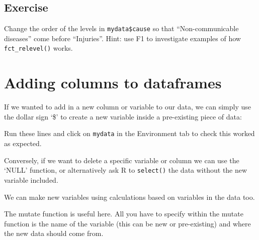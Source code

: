 \documentclass[12pt,]{krantz}
\makeatletter
\newenvironment{Shaded}{\begin{snugshade}}{\end{snugshade}}
\newcommand{\DecValTok}[1]{\textcolor[rgb]{0.00,0.00,0.81}{#1}}
\newcommand{\KeywordTok}[1]{\textcolor[rgb]{0.13,0.29,0.53}{\textbf{#1}}}
\newcommand{\NormalTok}[1]{#1}
\newcommand{\OperatorTok}[1]{\textcolor[rgb]{0.81,0.36,0.00}{\textbf{#1}}}
\newcommand{\OtherTok}[1]{\textcolor[rgb]{0.56,0.35,0.01}{#1}}
\newcommand{\StringTok}[1]{\textcolor[rgb]{0.31,0.60,0.02}{#1}}
\newenvironment{kframe}{%
\medskip{}
\setlength{\fboxsep}{.8em}
 \def\at@end@of@kframe{}%
 \ifinner\ifhmode%
  \def\at@end@of@kframe{\end{minipage}}%
  \begin{minipage}{\columnwidth}%
 \fi\fi%
 \def\FrameCommand##1{\hskip\@totalleftmargin \hskip-\fboxsep
 \colorbox{shadecolor}{##1}\hskip-\fboxsep
     \hskip-\linewidth \hskip-\@totalleftmargin \hskip\columnwidth}%
 \MakeFramed {\advance\hsize-\width
   \@totalleftmargin\z@ \linewidth\hsize
   \@setminipage}}%
 {\par\unskip\endMakeFramed%
 \at@end@of@kframe}
\renewenvironment{Shaded}{\begin{kframe}}{\end{kframe}}
\theoremstyle{definition}
\theoremstyle{definition}
\theoremstyle{definition}
\theoremstyle{remark}
\makeatother
\begin{document}
\hypertarget{exercise-4}{%
\subsection{Exercise}\label{exercise-4}}

Change the order of the levels in \texttt{mydata\$cause} so that
``Non-communicable diseases'' come before ``Injuries''. Hint: use F1 to
investigate examples of how \texttt{fct\_relevel()} works.

\hypertarget{adding-columns-to-dataframes}{%
\section{Adding columns to
dataframes}\label{adding-columns-to-dataframes}}

If we wanted to add in a new column or variable to our data, we can
simply use the dollar sign `\$' to create a new variable inside a
pre-existing piece of data:

\begin{Shaded}
\end{Shaded}

Run these lines and click on \texttt{mydata} in the Environment tab to
check this worked as expected.

Conversely, if we want to delete a specific variable or column we can
use the `NULL' function, or alternatively ask R to \texttt{select()} the
data without the new variable included.

\begin{Shaded}
\end{Shaded}

We can make new variables using calculations based on variables in the
data too.

The mutate function is useful here. All you have to specify within the
mutate function is the name of the variable (this can be new or
pre-existing) and where the new data should come from.
\end{document}
